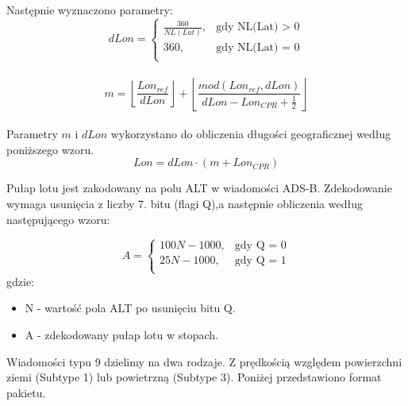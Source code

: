 \documentclass[eng,printmode]{mgr}
\newcommand{\floor}[1]{\left\lfloor #1 \right\rfloor}
\begin{document}
\noindent
Następnie wyznaczono parametry:
\begin{equation}
\renewcommand*{\arraystretch}{1.3}
dLon= \left\{ \begin{array}{ll}

\frac{360}{NL(Lat)}, & \textrm{gdy NL(Lat) > 0}\\
360 , & \textrm{gdy NL(Lat) = 0}\\

\end{array} \right.
\end{equation}
\\
\begin{equation}
m = \floor{\frac{Lon_{ref}}{dLon}} + \floor{\frac{mod(Lon_{ref},dLon)}{dLon - Lon_{CPR} + \frac{1}{2}}}
\end{equation}
\\


Parametry $m$ i $dLon$ wykorzystano do obliczenia długości geograficznej według poniższego wzoru.
\begin{equation}
Lon = dLon \cdot \left(m + Lon_{CPR}\right)
\end{equation}
\vskip 0.3cm

Pułap lotu jest zakodowany na polu ALT w wiadomości ADS-B. Zdekodowanie wymaga usunięcia z liczby 7. bitu (flagi Q),a następnie obliczenia według następującego wzoru:

\begin{equation}
\renewcommand*{\arraystretch}{1.3}
A= \left\{ \begin{array}{ll}

100N - 1000, & \textrm{gdy Q = 0}\\
25N - 1000, & \textrm{gdy Q = 1}\\

\end{array} \right.
\end{equation}
\noindent
gdzie: 
\begin{itemize}
\item N - wartość pola ALT po usunięciu bitu Q.
\item A - zdekodowany pułap lotu w stopach.
\end{itemize}

Wiadomości typu 9 dzielimy na dwa rodzaje. Z prędkością względem powierzchni ziemi (Subtype 1) lub powietrzną (Subtype 3). Poniżej przedstawiono format pakietu.
\end{document}
